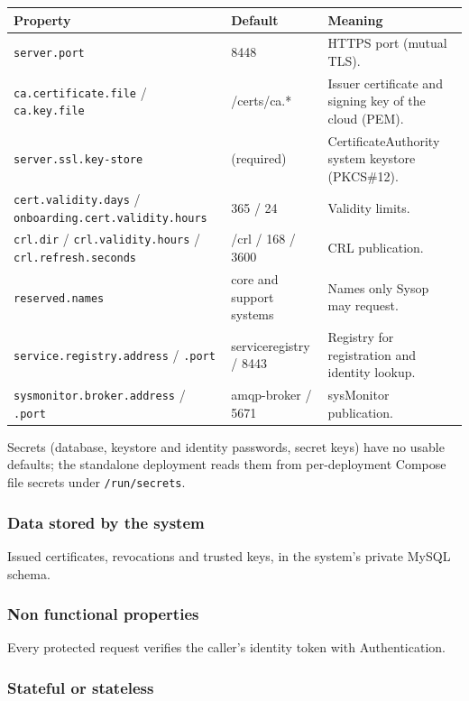 \documentclass[a4paper]{arrowhead}
\begin{document}
\noindent\begin{longtable}{| p{5.4cm} | p{3.4cm} | p{6.4cm} |} \hline
\rowcolor{gray!33} Property & Default & Meaning \\ \hline \endhead
\texttt{server.port} & 8448 & HTTPS port (mutual TLS). \\ \hline
\texttt{ca.certificate.file} / \texttt{ca.key.file} & /certs/ca.* & Issuer certificate and signing key of the cloud (PEM). \\ \hline
\texttt{server.ssl.key-store} & (required) & Certificate\allowbreak{}Authority system keystore (PKCS\#12). \\ \hline
\texttt{cert.validity.days} / \texttt{onboarding.cert.validity.hours} & 365 / 24 & Validity limits. \\ \hline
\texttt{crl.dir} / \texttt{crl.validity.hours} / \texttt{crl.refresh.seconds} & /crl / 168 / 3600 & CRL publication. \\ \hline
\texttt{reserved.names} & core and support systems & Names only Sysop may request. \\ \hline
\texttt{service.registry.address} / \texttt{.port} & serviceregistry / 8443 & Registry for registration and identity lookup. \\ \hline
\texttt{sysmonitor.broker.address} / \texttt{.port} & amqp-broker / 5671 & sysMonitor publication. \\ \hline
\end{longtable}

Secrets (database, keystore and identity passwords, secret keys) have no usable defaults; the standalone deployment reads them from per-deployment Compose file secrets under \texttt{/\allowbreak{}run/\allowbreak{}secrets}.

\subsubsection{Data stored by the system}

Issued certificates, revocations and trusted keys, in the system's private MySQL schema.

\subsubsection{Non functional properties}

Every protected request verifies the caller's identity token with Authentication.

\subsubsection{Stateful or stateless}
\end{document}
